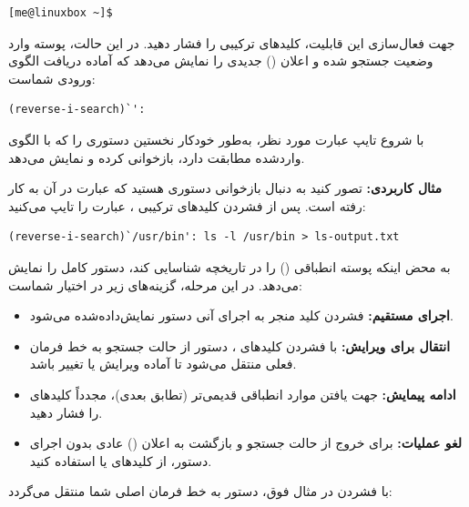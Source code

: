 \begin{latin}
\begin{lstlisting}
[me@linuxbox ~]$
\end{lstlisting}
\end{latin}

جهت فعال‌سازی این قابلیت، کلیدهای ترکیبی  را فشار دهید. در این حالت، پوسته وارد وضعیت جستجو شده و اعلان () جدیدی را نمایش می‌دهد که آماده دریافت الگوی ورودی شماست:

\begin{latin}
\begin{lstlisting}
(reverse-i-search)`':
\end{lstlisting}
\end{latin}

با شروع تایپ عبارت مورد نظر،  به‌طور خودکار نخستین دستوری را که با الگوی واردشده مطابقت دارد، بازخوانی کرده و نمایش می‌دهد.

\textbf{مثال کاربردی:} تصور کنید به دنبال بازخوانی دستوری هستید که عبارت  در آن به کار رفته است. پس از فشردن کلیدهای ترکیبی ، عبارت  را تایپ می‌کنید:

\begin{latin}
\begin{lstlisting}
(reverse-i-search)`/usr/bin': ls -l /usr/bin > ls-output.txt
\end{lstlisting}
\end{latin}

به محض اینکه پوسته انطباقی () را در تاریخچه شناسایی کند، دستور کامل را نمایش می‌دهد. در این مرحله، گزینه‌های زیر در اختیار شماست:

\begin{itemize}
  \item \textbf{اجرای مستقیم:} فشردن کلید  منجر به اجرای آنی دستور نمایش‌داده‌شده می‌شود.
  \item \textbf{انتقال برای ویرایش:} با فشردن کلیدهای ، دستور از حالت جستجو به خط فرمان فعلی منتقل می‌شود تا آماده ویرایش یا تغییر باشد.
  \item \textbf{ادامه پیمایش:} جهت یافتن موارد انطباقی قدیمی‌تر (تطابق بعدی)، مجدداً کلیدهای  را فشار دهید.
  \item \textbf{لغو عملیات:} برای خروج از حالت جستجو و بازگشت به اعلان () عادی بدون اجرای دستور، از کلیدهای  یا  استفاده کنید.
\end{itemize}

با فشردن  در مثال فوق، دستور به خط فرمان اصلی شما منتقل می‌گردد:

